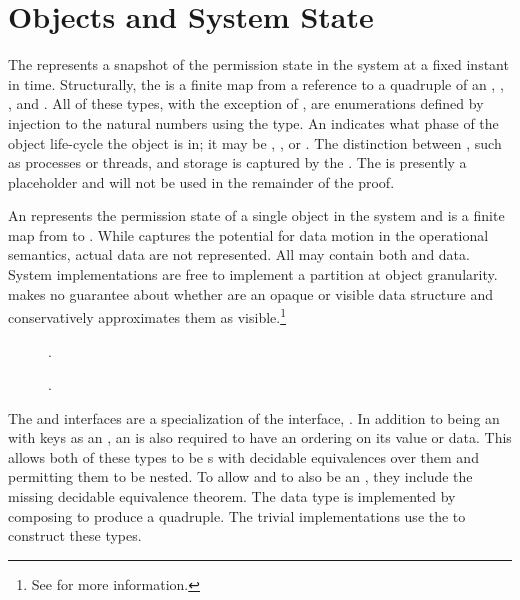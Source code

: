 \section{Objects and System State}
\label{sect:embed:systemState}

The \term{\TMsystemState{}} represents a snapshot of the permission state in the system at a fixed instant in time.
Structurally, the \TMsystemState{} is a finite map from a reference to a quadruple of an \TMobj{}, \TMobjLabel{}, \TMobjType{}, and \TMobjSchedule{}.
All of these types, with the exception of \TMobjs{}, are enumerations defined by injection to the natural numbers using the \COQProjectedToNat{} type.
An \COQobjLabel{} indicates what phase of the object life-cycle the object is in; it may be \COQunborn{}, \COQalive{}, or \COQdead{}.
The distinction between \COQactive{} \TMobjs{}, such as processes or threads, and \COQpassive{} storage \TMobjs{} is captured by the \COQobjType{}.
The \COQobjSchedule{} is presently a placeholder and will not be used in the remainder of the proof.

An \term{\TMobj{}} represents the permission state of a single object in the system and is a finite map from \term{\TMidxs} to \term{\TMcaps}.
While \TMmodelName{} captures the potential for data motion in the operational semantics, actual data are not represented.
All \TMobjs{} may contain both \TMcaps{} and data.
System implementations are free to implement a partition at object granularity.
\TMmodelName{} makes no guarantee about whether \TMcaps{} are an opaque or visible data structure and conservatively approximates them as visible.\footnote{See  for more information.}

\begin{figure}
  \COQDOCObjects{}
\caption{\xmakefirstuc{\TMobjs}. \label{fig:embed:objs}}
\end{figure}

\begin{figure}
  \COQDOCSystemState{}
\caption{\xmakefirstuc{\TMsystemState}. \label{fig:embed:systemState}}
\end{figure}

The \TMobj{} and \TMsystemState{} interfaces are a specialization of the \term{\TMOrderedFMap{}} interface, \COQOrderedFMap{}.
In addition to being an \COQFMap{} with keys as an \COQOrderedType{}, an \TMOrderedFMap{} is also required to have an ordering on its value or data.
This allows both of these types to be \COQOrderedType{}s with decidable equivalences over them and permitting them to be nested.
To allow \TMobjs{} and \TMsystemStates{} to also be an \COQOrderedType{}, they include the missing decidable equivalence theorem.
The \TMsystemState{} data type is implemented by composing \COQProductType{} to produce a quadruple.
The trivial implementations use the \COQFMapList{} to construct these types.

